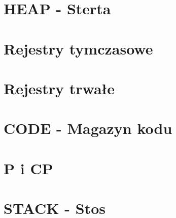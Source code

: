 \section{{HEAP} - Sterta}

\section{Rejestry tymczasowe}

\section{Rejestry trwałe}

\section{{CODE} - Magazyn kodu}

\section{{P} i {CP}}

\section{{STACK} - Stos}

